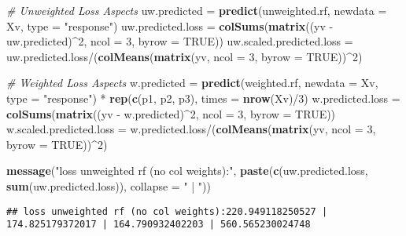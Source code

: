 \documentclass[10pt]{report}
\newenvironment{Shaded}{}{}
\newcommand{\KeywordTok}[1]{\textcolor[rgb]{0.00,0.44,0.13}{\textbf{{#1}}}}
\newcommand{\DataTypeTok}[1]{\textcolor[rgb]{0.56,0.13,0.00}{{#1}}}
\newcommand{\DecValTok}[1]{\textcolor[rgb]{0.25,0.63,0.44}{{#1}}}
\newcommand{\StringTok}[1]{\textcolor[rgb]{0.25,0.44,0.63}{{#1}}}
\newcommand{\CommentTok}[1]{\textcolor[rgb]{0.38,0.63,0.69}{\textit{{#1}}}}
\newcommand{\OtherTok}[1]{\textcolor[rgb]{0.00,0.44,0.13}{{#1}}}
\newcommand{\NormalTok}[1]{{#1}}
\begin{document}
\begin{Shaded}
\begin{Highlighting}[]
\CommentTok{# Unweighted Loss Aspects}
\NormalTok{uw.predicted =}\StringTok{ }\KeywordTok{predict}\NormalTok{(unweighted.rf, }\DataTypeTok{newdata =} \NormalTok{Xv, }\DataTypeTok{type =} \StringTok{"response"}\NormalTok{)}
\NormalTok{uw.predicted.loss =}\StringTok{ }\KeywordTok{colSums}\NormalTok{(}\KeywordTok{matrix}\NormalTok{((yv -}\StringTok{ }\NormalTok{uw.predicted)^}\DecValTok{2}\NormalTok{, }\DataTypeTok{ncol =} \DecValTok{3}\NormalTok{, }\DataTypeTok{byrow =} \OtherTok{TRUE}\NormalTok{))}
\NormalTok{uw.scaled.predicted.loss =}\StringTok{ }\NormalTok{uw.predicted.loss/(}\KeywordTok{colMeans}\NormalTok{(}\KeywordTok{matrix}\NormalTok{(yv, }\DataTypeTok{ncol =} \DecValTok{3}\NormalTok{, }
    \DataTypeTok{byrow =} \OtherTok{TRUE}\NormalTok{))^}\DecValTok{2}\NormalTok{)}

\CommentTok{# Weighted Loss Aspects}
\NormalTok{w.predicted =}\StringTok{ }\KeywordTok{predict}\NormalTok{(weighted.rf, }\DataTypeTok{newdata =} \NormalTok{Xv, }\DataTypeTok{type =} \StringTok{"response"}\NormalTok{) *}\StringTok{ }\KeywordTok{rep}\NormalTok{(}\KeywordTok{c}\NormalTok{(p1, }
    \NormalTok{p2, p3), }\DataTypeTok{times =} \KeywordTok{nrow}\NormalTok{(Xv)/}\DecValTok{3}\NormalTok{)}
\NormalTok{w.predicted.loss =}\StringTok{ }\KeywordTok{colSums}\NormalTok{(}\KeywordTok{matrix}\NormalTok{((yv -}\StringTok{ }\NormalTok{w.predicted)^}\DecValTok{2}\NormalTok{, }\DataTypeTok{ncol =} \DecValTok{3}\NormalTok{, }\DataTypeTok{byrow =} \OtherTok{TRUE}\NormalTok{))}
\NormalTok{w.scaled.predicted.loss =}\StringTok{ }\NormalTok{w.predicted.loss/(}\KeywordTok{colMeans}\NormalTok{(}\KeywordTok{matrix}\NormalTok{(yv, }\DataTypeTok{ncol =} \DecValTok{3}\NormalTok{, }\DataTypeTok{byrow =} \OtherTok{TRUE}\NormalTok{))^}\DecValTok{2}\NormalTok{)}

\KeywordTok{message}\NormalTok{(}\StringTok{"loss unweighted rf (no col weights):"}\NormalTok{, }\KeywordTok{paste}\NormalTok{(}\KeywordTok{c}\NormalTok{(uw.predicted.loss, }\KeywordTok{sum}\NormalTok{(uw.predicted.loss)), }
    \DataTypeTok{collapse =} \StringTok{" | "}\NormalTok{))}
\end{Highlighting}
\end{Shaded}

\begin{verbatim}
## loss unweighted rf (no col weights):220.949118250527 | 174.825179372017 | 164.790932402203 | 560.565230024748
\end{verbatim}
\end{document}
